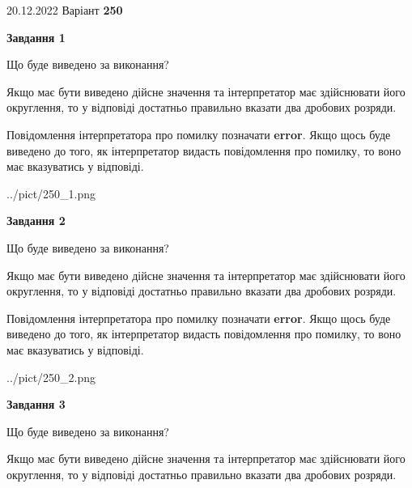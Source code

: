 \documentclass[12pt, ukrainian]{article}
\begin{document}
{20.12.2022 Варіант \No \textbf { 250 }\par}
{
\begin {Large}

{\begin {center}\textbf{Завдання 1}\end {center}}\par
Що буде виведено за виконання? \par

Якщо має бути виведено дійсне значення та інтерпретатор має здійснювати його округлення, 
то у відповіді достатньо правильно вказати два дробових розряди.

Повідомлення інтерпретатора про помилку позначати \textbf{error}.
Якщо щось буде виведено до того, як інтерпретатор видасть повідомлення про помилку, 
то воно має вказуватись у відповіді. \par

\begin{center}
	{../pict/250_1.png}
\end{center}
\newpage

{\begin {center}\textbf{Завдання 2}\end {center}}\par
Що буде виведено за виконання? \par

Якщо має бути виведено дійсне значення та інтерпретатор має здійснювати його округлення, 
то у відповіді достатньо правильно вказати два дробових розряди.

Повідомлення інтерпретатора про помилку позначати \textbf{error}.
Якщо щось буде виведено до того, як інтерпретатор видасть повідомлення про помилку, 
то воно має вказуватись у відповіді. \par

\begin{center}
	{../pict/250_2.png}
\end{center}
\newpage

{\begin {center}\textbf{Завдання 3}\end {center}}\par
Що буде виведено за виконання? \par

Якщо має бути виведено дійсне значення та інтерпретатор має здійснювати його округлення, 
то у відповіді достатньо правильно вказати два дробових розряди.


\end{Large}}
\end{document}
